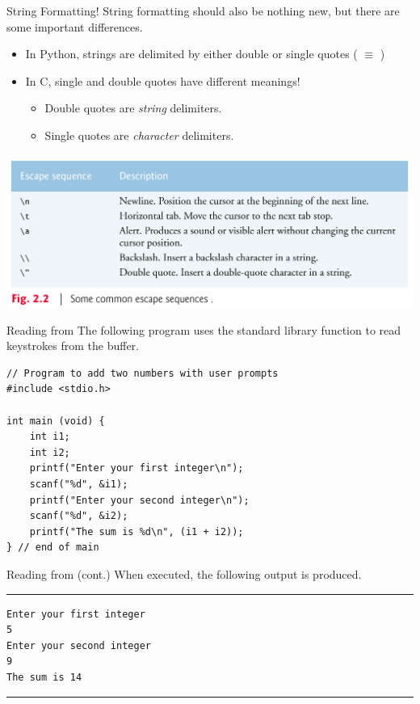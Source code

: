 \documentclass[11pt]{beamer}
\let\OldTexttt\texttt
\renewcommand{\texttt}[1]{\OldTexttt{\color{teal}{#1}}}
\begin{document}
\begin{frame}{String Formatting!}
String formatting should also be nothing new, but there are some important differences.
\begin{itemize}
\item In Python, strings are delimited by either double or single quotes (\texttt{"Hello World"} $\equiv$ \texttt{'Hello World'})
\item In C, single and double quotes have different meanings! 
\begin{itemize}
\item Double quotes are \emph{string} delimiters.
\item Single quotes are \emph{character} delimiters.
\end{itemize}
\end{itemize}
\center\includegraphics[scale=0.1]{escape.png}
\end{frame}

\begin{frame}[fragile=singleslide]{Reading from \texttt{stdin}}
The following program uses the \texttt{scanf} standard library function to read keystrokes from the \texttt{stdin} buffer.
\begin{lstlisting}[style=C]
// Program to add two numbers with user prompts
#include <stdio.h>

int main (void) { 
	int i1;
	int i2;
	printf("Enter your first integer\n");
	scanf("%d", &i1);
	printf("Enter your second integer\n");
	scanf("%d", &i2);
	printf("The sum is %d\n", (i1 + i2));
} // end of main
\end{lstlisting}
\end{frame}

\begin{frame}[fragile=singleslide]{Reading from \texttt{stdin} (cont.)}
When executed, the following output is produced.  
\hrule
\begin{verbatim}
Enter your first integer
5
Enter your second integer
9
The sum is 14
\end{verbatim}
\hrule
\end{frame}
\end{document}
